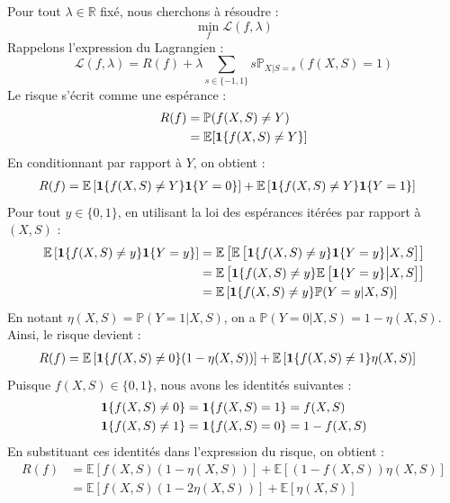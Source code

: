 Pour tout $\lambda \in \mathbb{R}$ fixé, nous cherchons à résoudre :
\begin{equation}
    \min_{f} \mathcal{L}(f, \lambda)
\end{equation}
Rappelons l'expression du Lagrangien :
\begin{equation}
    \mathcal{L}(f, \lambda) = R(f) + \lambda \sum_{s \in \{-1, 1\}} s \mathbb{P}_{X|S=s}(f(X,S)=1)
\end{equation}
Le risque s'écrit comme une espérance :
\begin{align*}
    R(f) &= \mathbb{P}(f(X,S) \neq Y) \\
    &= \mathbb{E}[\mathbf{1}\{f(X,S) \neq Y\}]
\end{align*}
En conditionnant par rapport à $Y$, on obtient :
\begin{align*}
    R(f) &= \mathbb{E}\left[ \mathbf{1}\{f(X,S) \neq Y\} \mathbf{1}\{Y=0\} \right] + \mathbb{E}\left[ \mathbf{1}\{f(X,S) \neq Y\} \mathbf{1}\{Y=1\} \right]
\end{align*}
Pour tout $y \in \{0, 1\}$, en utilisant la loi des espérances itérées par rapport à $(X,S)$ :
\begin{align*}
    \mathbb{E}\left[ \mathbf{1}\{f(X,S) \neq y\} \mathbf{1}\{Y=y\} \right] &= \mathbb{E}\left[ \mathbb{E}\left[ \mathbf{1}\{f(X,S) \neq y\} \mathbf{1}\{Y=y\} \big| X, S \right] \right] \\
    &= \mathbb{E}\left[ \mathbf{1}\{f(X,S) \neq y\} \mathbb{E}\left[ \mathbf{1}\{Y=y\} \big| X, S \right] \right] \\
    &= \mathbb{E}\left[ \mathbf{1}\{f(X,S) \neq y\} \mathbb{P}(Y=y | X, S) \right]
\end{align*}
En notant $\eta(X,S) = \mathbb{P}(Y=1 | X,S)$, on a $\mathbb{P}(Y=0 | X,S) = 1 - \eta(X,S)$.
Ainsi, le risque devient :
\begin{align*}
    R(f) &= \mathbb{E}\left[ \mathbf{1}\{f(X,S) \neq 0\} (1 - \eta(X,S)) \right] + \mathbb{E}\left[ \mathbf{1}\{f(X,S) \neq 1\} \eta(X,S) \right]
\end{align*}
Puisque $f(X,S) \in \{0, 1\}$, nous avons les identités suivantes :
\begin{align*}
    \mathbf{1}\{f(X,S) \neq 0\} &= \mathbf{1}\{f(X,S) = 1\} = f(X,S) \\
    \mathbf{1}\{f(X,S) \neq 1\} &= \mathbf{1}\{f(X,S) = 0\} = 1 - f(X,S)
\end{align*}
En substituant ces identités dans l'expression du risque, on obtient :
\begin{align*}
    R(f) &= \mathbb{E}\left[ f(X,S) (1 - \eta(X,S)) \right] + \mathbb{E}\left[ (1 - f(X,S)) \eta(X,S) \right] \\
    &= \mathbb{E}\left[ f(X,S) (1 - 2\eta(X,S)) \right] + \mathbb{E}\left[ \eta(X,S) \right]
\end{align*}
